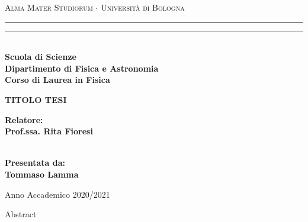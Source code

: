 \documentclass[12pt,a4paper]{report}
\begin{document}
\begin{titlepage}
   \begin{center}
        {{\Large{\textsc{Alma Mater Studiorum $\cdot$ Universit\`a di Bologna}}}} 
        \rule[0.1cm]{15.8cm}{0.1mm}
        \rule[0.5cm]{15.8cm}{0.6mm}
        \\\vspace{3mm}
        {\small{\bf Scuola di Scienze \\ 
        Dipartimento di Fisica e Astronomia\\
        Corso di Laurea in Fisica}}
    \end{center}
    \vspace{23mm}
    \begin{center}
        {{\LARGE{\bf TITOLO TESI}}\\}
    \end{center}
    \vspace{50mm} \par \noindent
    \begin{minipage}[t]{0.47\textwidth}
        {\large{\bf Relatore: \vspace{2mm}\\
        Prof.ssa. Rita Fioresi\\\\
        }}
    \end{minipage}
    \hfill
    \begin{minipage}[t]{0.47\textwidth}\raggedleft
        {\large{\bf Presentata da:
        \vspace{2mm}\\
        Tommaso Lamma}}
    \end{minipage}
    \vspace{40mm}
    \begin{center}
        Anno Accademico 2020/2021
    \end{center}
\end{titlepage}


\begin{center}
    {\Large Abstract}\\
\end{center}

\newpage
\end{document}
